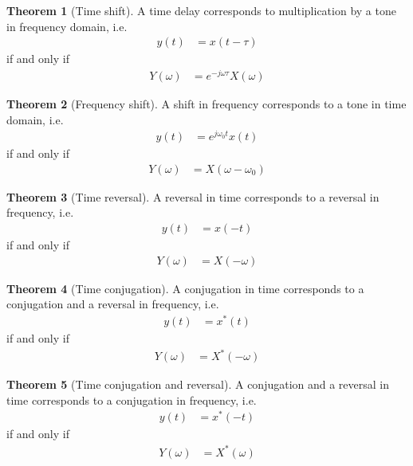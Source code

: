 \documentclass[titlepage, fleqn, a4paper, 12pt, twoside]{article}
\theoremstyle{definition}
\theoremstyle{theorem}
\newtheorem{theorem}{Theorem}
\begin{document}
\begin{theorem}[Time shift]
	A time delay corresponds to multiplication by a tone in frequency domain, i.e.
	\begin{align*}
		y(t) &= x(t - \tau)
	\end{align*}
	if and only if
	\begin{align*}
		Y(\omega) &= e^{-j \omega \tau} X(\omega)
	\end{align*}
	\label{thm:time_shift}
\end{theorem}

\begin{theorem}[Frequency shift]
	A shift in frequency corresponds to a tone in time domain, i.e.
	\begin{align*}
		y(t) &= e^{j \omega_0 t} x(t)
	\end{align*}
	if and only if
	\begin{align*}
		Y(\omega) &= X(\omega - \omega_0)
	\end{align*}
	\label{thm:frequency_shift}
\end{theorem}

\begin{theorem}[Time reversal]
	A reversal in time corresponds to a reversal in frequency, i.e.
	\begin{align*}
		y(t) &= x(-t)
	\end{align*}
	if and only if
	\begin{align*}
		Y(\omega) &= X(-\omega)
	\end{align*}
	\label{thm:time_reversal}
\end{theorem}

\begin{theorem}[Time conjugation]
	A conjugation in time corresponds to a conjugation and a reversal in frequency, i.e.
	\begin{align*}
		y(t) &= x^*(t)
	\end{align*}
	if and only if
	\begin{align*}
		Y(\omega) &= X^*(-\omega)
	\end{align*}
	\label{thm:time_conjugation}
\end{theorem}

\begin{theorem}[Time conjugation and reversal]
	A conjugation and a reversal in time corresponds to a conjugation in frequency, i.e.
	\begin{align*}
		y(t) &= x^*(-t)
	\end{align*}
	if and only if
	\begin{align*}
		Y(\omega) &= X^*(\omega)
	\end{align*}
	\label{thm:time_conjugation_and_reversal}
\end{theorem}
\end{document}
